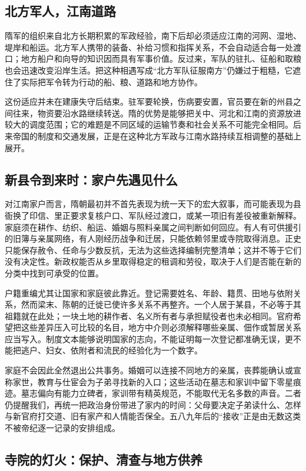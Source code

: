 \subsection{北方军人，江南道路}

隋军的组织来自北方长期积累的军政经验，南下后却必须适应江南的河网、湿地、堤岸和船运。北方军人携带的装备、补给习惯和指挥关系，不会自动适合每一处渡口；地方船户和向导的知识因而具有军事价值。反过来，军队的驻扎、征船和取粮也会迅速改变沿岸生活。把这种相遇写成“北方军队征服南方”仍嫌过于粗糙，它遮住了实际把军令转为行动的船、粮、道路和地方协作。

这份适应并未在建康失守后结束。驻军要轮换，伤病要安置，官员要在新的州县之间往来，物资要沿水路继续转送。隋的优势是能够把关中、河北和江南的资源放进较大的调度范围；它的难题是不同区域的运输节奏和社会关系不可能完全相同。后来帝国的制度和交通发展，正是在这种北方军政与江南水路持续互相调整的基础上展开。

\subsection{新县令到来时：家户先遇见什么}

对江南家户而言，隋朝最初并不首先表现为统一天下的宏大叙事，而可能表现为县衙换了印信、里正要求复核户口、军队经过渡口，或某一项旧有差役被重新解释。家庭须在耕作、纺织、船运、婚姻与照料亲属之间判断如何回应。有人有可供援引的旧簿与亲属网络，有人刚经历战争和迁居，只能依赖邻里或寺院取得消息。正史只能保存赦令、任命与少数反抗，无法为这些选择编制完整清单；这并不等于它们没有决定性。新政权能否从乡里取得稳定的租调和劳役，取决于人们是否能在新的分类中找到可承受的位置。

户籍重编尤其让国家和家庭彼此靠近。登记需要姓名、年龄、籍贯、田地与依附关系，然而梁末、陈朝的迁徙已使许多关系不再整齐。一个人居于某县，不必等于其祖籍就在此处；一块土地的耕作者、名义所有者与承担赋役者也未必相同。官府希望把这些差异压入可比较的名目，地方中介则必须解释哪些亲属、佃作或暂居关系应当写入。制度文本能够说明国家的志向，不能证明每一次登记都准确无误，更不能把逃户、妇女、依附者和流民的经验化为一个数字。

家庭不会因此全然退出公共事务。婚姻可以连接不同地方的亲属，丧葬能确认或宣称家世，教育与仕宦会为子弟寻找新的入口；这些活动在墓志和家训中留下零星痕迹。墓志偏向有能力立碑者，家训带有精英规范，不能取代无名多数的声音。二者仍提醒我们，再统一把政治身份带进了家内的时间：父母要决定子弟读什么、怎样与新官府打交道、旧有家产和人情能否保全。五八九年后的“接收”正是由无数这类不被帝纪逐一记录的安排组成。

\subsection{寺院的灯火：保护、清查与地方供养}

